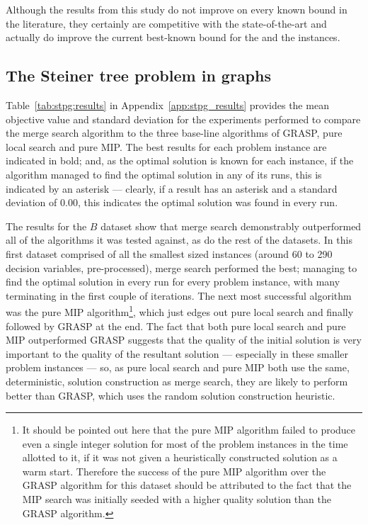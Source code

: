 \documentclass[journal]{IEEEtran}
\begin{document}
Although the results from this study do not improve on every known bound in the literature, they certainly are competitive with the state-of-the-art and actually do improve the current best-known bound for the \dmine{} and the \zucklarge{} instances.

\subsection{The Steiner tree problem in graphs}

Table~\ref{tab:stpg:results} in Appendix~\ref{app:stpg_results} provides the mean objective value and standard deviation for the experiments performed to compare the merge search algorithm to the three base-line algorithms of GRASP, pure local search and pure MIP. The best results for each problem instance are indicated in bold; and, as the optimal solution is known for each instance, if the algorithm managed to find the optimal solution in any of its runs, this is indicated by an asterisk --- clearly, if a result has an asterisk and a standard deviation of 0.00, this indicates the optimal solution was found in every run.

The results for the \(B\) dataset show that merge search demonstrably outperformed all of the algorithms it was tested against, as do the rest of the datasets. In this first dataset comprised of all the smallest sized instances (around 60 to 290 decision variables, pre-processed), merge search performed the best; managing to find the optimal solution in every run for every problem instance, with many terminating in the first couple of iterations. The next most successful algorithm was the pure MIP algorithm\footnote{It should be pointed out here that the pure MIP algorithm failed to produce even a single integer solution for most of the problem instances in the time allotted to it, if it was not given a heuristically constructed solution as a warm start. Therefore the success of the pure MIP algorithm over the GRASP algorithm for this dataset should be attributed to the fact that the MIP search was initially seeded with a higher quality solution than the GRASP algorithm.}, which just edges out pure local search and finally followed by GRASP at the end. The fact that both pure local search and pure MIP outperformed GRASP suggests that the quality of the initial solution is very important to the quality of the resultant solution --- especially in these smaller problem instances --- so, as pure local search and pure MIP both use the same, deterministic, solution construction as merge search, they are likely to perform better than GRASP, which uses the random solution construction heuristic.
\end{document}
